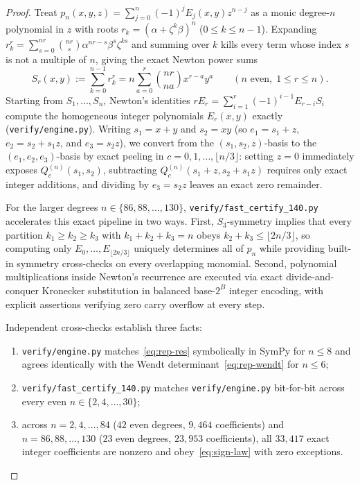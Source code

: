 \documentclass[10pt]{article}
\numberwithin{equation}{section}
\theoremstyle{plain}
\theoremstyle{definition}
\newcommand{\1}{\mathbf{1}}
\newcommand{\code}[1]{\texttt{#1}}
\begin{document}
\begin{proof}
Treat $p_n(x, y, z) = \sum_{j=0}^{n} (-1)^j E_j(x, y) z^{n-j}$ as a monic degree-$n$ polynomial in $z$ with roots $r_k = (\alpha + \zeta^k\beta)^n$ ($0 \le k \le n - 1$). Expanding $r_k^r = \sum_{s=0}^{nr} \binom{nr}{s} \alpha^{nr-s}\beta^s \zeta^{ks}$ and summing over $k$ kills every term whose index $s$ is not a multiple of $n$, giving the exact Newton power sums
\begin{equation}\label{eq:newton-Sr}
S_r(x, y) := \sum_{k=0}^{n-1} r_k^r = n \sum_{a=0}^{r} \binom{nr}{na} x^{r-a} y^a \qquad (n \text{ even},\; 1 \le r \le n).
\end{equation}
Starting from $S_1, \dots, S_n$, Newton's identities $r E_r = \sum_{i=1}^{r} (-1)^{i-1} E_{r-i} S_i$ compute the homogeneous integer polynomials $E_r(x, y)$ exactly (\code{verify/engine.py}). Writing $s_1 = x + y$ and $s_2 = xy$ (so $e_1 = s_1 + z$, $e_2 = s_2 + s_1 z$, and $e_3 = s_2 z$), we convert from the $(s_1, s_2, z)$-basis to the $(e_1, e_2, e_3)$-basis by exact peeling in $c = 0, 1, \dots, \lfloor n/3 \rfloor$: setting $z = 0$ immediately exposes $Q_c^{(n)}(s_1, s_2)$, subtracting $Q_c^{(n)}(s_1 + z, s_2 + s_1 z)$ requires only exact integer additions, and dividing by $e_3 = s_2 z$ leaves an exact zero remainder.

For the larger degrees $n \in \{86, 88, \dots, 130\}$, \code{verify/fast\_certify\_140.py} accelerates this exact pipeline in two ways. First, $S_3$-symmetry implies that every partition $k_1 \ge k_2 \ge k_3$ with $k_1 + k_2 + k_3 = n$ obeys $k_2 + k_3 \le \lfloor 2n/3 \rfloor$, so computing only $E_0, \dots, E_{\lfloor 2n/3 \rfloor}$ uniquely determines all of $p_n$ while providing built-in symmetry cross-checks on every overlapping monomial. Second, polynomial multiplications inside Newton's recurrence are executed via exact divide-and-conquer Kronecker substitution in balanced base-$2^B$ integer encoding, with explicit assertions verifying zero carry overflow at every step.

Independent cross-checks establish three facts:
\begin{enumerate}[label=(\roman*)]
    \item \code{verify/engine.py} matches~\eqref{eq:rep-res} symbolically in SymPy for $n \le 8$ and agrees identically with the Wendt determinant~\eqref{eq:rep-wendt} for $n \le 6$;
    \item \code{verify/fast\_certify\_140.py} matches \code{verify/engine.py} bit-for-bit across every even $n \in \{2, 4, \dots, 30\}$;
    \item across $n = 2, 4, \dots, 84$ ($42$ even degrees, $9{,}464$ coefficients) and $n = 86, 88, \dots, 130$ ($23$ even degrees, $23{,}953$ coefficients), all $33{,}417$ exact integer coefficients are nonzero and obey~\eqref{eq:sign-law} with zero exceptions. \qedhere
\end{enumerate}
\end{proof}
\end{document}
